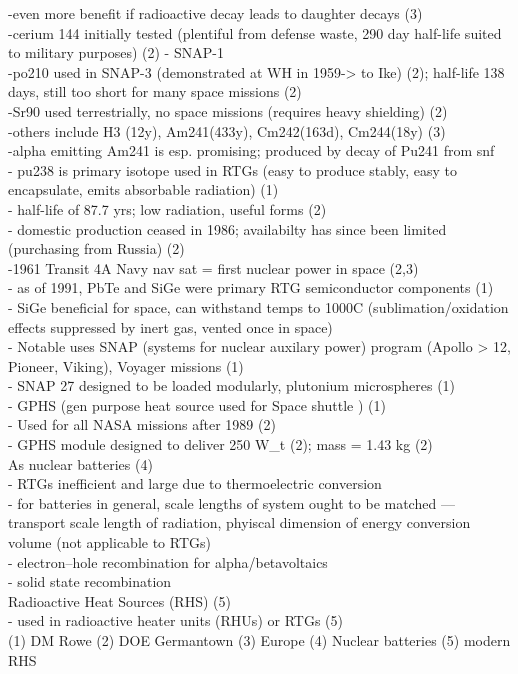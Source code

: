\documentclass{report}
\begin{document}
-even more benefit if radioactive decay leads to daughter decays (3)\\
-cerium 144 initially tested (plentiful from defense waste, 290 day half-life suited to military purposes) (2) - SNAP-1\\
-po210 used in SNAP-3 (demonstrated at WH in 1959-> to Ike) (2); half-life 138 days, still too short for many space missions (2)\\
-Sr90 used terrestrially, no space missions (requires heavy shielding) (2)\\
-others include H3 (12y), Am241(433y), Cm242(163d), Cm244(18y) (3)\\
-alpha emitting Am241 is esp. promising; produced by decay of Pu241 from snf\\

- pu238 is primary isotope used in RTGs (easy to produce stably, easy to encapsulate, emits absorbable radiation) (1)\\
- half-life of 87.7 yrs; low radiation, useful forms (2)\\
- domestic production ceased in 1986; availabilty has since been limited (purchasing from Russia) (2)\\
-1961 Transit 4A Navy nav sat = first nuclear power in space (2,3)\\
- as of 1991, PbTe and SiGe were primary RTG semiconductor components (1)\\
- SiGe beneficial for space, can withstand temps to 1000C (sublimation/oxidation effects suppressed by inert gas, vented once in space)\\
- Notable uses SNAP (systems for nuclear auxilary power) program (Apollo > 12, Pioneer, Viking), Voyager missions (1)\\
- SNAP 27 designed to be loaded modularly, plutonium microspheres (1)\\
- GPHS (gen purpose heat source used for Space shuttle ) (1)\\
- Used for all NASA missions after 1989 (2)\\
- GPHS module designed to deliver 250 W\_t (2); mass = 1.43 kg (2)\\

As nuclear batteries (4)\\
- RTGs inefficient and large due to thermoelectric conversion\\
- for batteries in general, scale lengths of system ought to be matched --- transport scale length of radiation, phyiscal dimension of energy conversion volume (not applicable to RTGs)\\
- electron--hole recombination for alpha/betavoltaics\\
- solid state recombination\\

Radioactive Heat Sources (RHS) (5)\\
- used in radioactive heater units (RHUs) or RTGs (5)\\


(1) DM Rowe
(2) DOE Germantown
(3) Europe
(4) Nuclear batteries
(5) modern RHS
\end{document}

